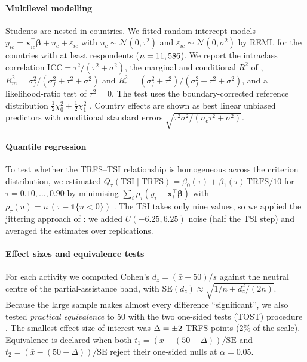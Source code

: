 \documentclass[preprint,12pt,authoryear]{elsarticle}
\theoremstyle{remark}
\begin{document}
\paragraph{Multilevel modelling} Students are nested in countries. We fitted random-intercept models $y_{ic}=\mathbf{x}_{ic}^{\top}\boldsymbol\beta+u_c+\varepsilon_{ic}$ with $u_c\sim\mathcal N(0,\tau^2)$ and $\varepsilon_{ic}\sim\mathcal N(0,\sigma^2)$ by REML \citep{raudenbush2002} for the \MlCountries{} countries with at least \MlMinN{} respondents ($n=11,586$). We report the intraclass correlation $\mathrm{ICC}=\tau^2/(\tau^2+\sigma^2)$, the marginal and conditional $R^2$ of \citet{nakagawa2013}, $R^2_m=\sigma_f^2/(\sigma_f^2+\tau^2+\sigma^2)$ and $R^2_c=(\sigma_f^2+\tau^2)/(\sigma_f^2+\tau^2+\sigma^2)$, and a likelihood-ratio test of $\tau^2=0$. The test uses the boundary-corrected reference distribution $\tfrac12\chi^2_0+\tfrac12\chi^2_1$ \citep{self1987}. Country effects are shown as best linear unbiased predictors with conditional standard errors $\sqrt{\tau^2\sigma^2/(n_c\tau^2+\sigma^2)}$.

\paragraph{Quantile regression} To test whether the TRFS--TSI relationship is homogeneous across the criterion distribution, we estimated $Q_{\tau}(\mathrm{TSI}\mid\mathrm{TRFS})=\beta_0(\tau)+\beta_1(\tau)\,\mathrm{TRFS}/10$ for $\tau=0.10,\dots,0.90$ by minimising $\sum_i\rho_\tau(y_i-\mathbf{x}_i^{\top}\boldsymbol\beta)$ with $\rho_\tau(u)=u\,(\tau-\mathbb 1\{u<0\})$ \citep{koenker1978}. The TSI takes only nine values, so we applied the jittering approach of \citet{machado2005}: we added $U(-6.25,6.25)$ noise (half the TSI step) and averaged the estimates over \QReps{} replications.

\paragraph{Effect sizes and equivalence tests} For each activity we computed Cohen's $d_z=(\bar x-50)/s$ against the neutral centre of the partial-assistance band, with $\mathrm{SE}(d_z)\approx\sqrt{1/n+d_z^2/(2n)}$. Because the large sample makes almost every difference ``significant'', we also tested \emph{practical equivalence} to 50 with the two one-sided tests (TOST) procedure \citep{schuirmann1987,lakens2017}. The smallest effect size of interest was $\Delta=\pm2$ TRFS points (2\% of the scale). Equivalence is declared when both $t_1=(\bar x-(50-\Delta))/\mathrm{SE}$ and $t_2=(\bar x-(50+\Delta))/\mathrm{SE}$ reject their one-sided nulls at $\alpha=0.05$.
\end{document}
